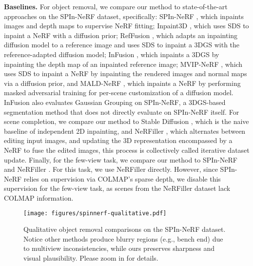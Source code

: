 \noindent\textbf{Baselines.}
For object removal, we compare our method to state-of-the-art approaches on the SPIn-NeRF dataset, specifically:
SPIn-NeRF \cite{spinnerf}, which inpaints images and depth maps to supervise NeRF fitting;
Inpaint3D \cite{prabhu2023inpaint3d}, which uses SDS \cite{poole2022dreamfusion} to inpaint a NeRF with a diffusion prior;
RefFusion \cite{mirzaei2024reffusion}, which adapts an inpainting diffusion model to a reference image and uses SDS to inpaint a 3DGS \cite{kerbl3Dgaussians} with the reference-adapted diffusion model;
InFusion \cite{liu2024infusion}, which inpaints a 3DGS by inpainting the depth map of an inpainted reference image;
MVIP-NeRF \cite{chen2024mvip}, which uses SDS to inpaint a NeRF by inpainting the rendered images and normal maps via a diffusion prior,
and MALD-NeRF \cite{lin2025taming}, which inpaints a NeRF by performing masked adversarial training for per-scene customization of a diffusion model.
InFusion \cite{liu2024infusion} also evaluates Gaussian Grouping \cite{ye2023gaussian} on SPIn-NeRF, a 3DGS-based segmentation method that does not directly evaluate on SPIn-NeRF itself.
For scene completion, we compare our method to 
Stable Diffusion \cite{stable.diffusion}, which is the naive baseline of independent 2D inpainting, and NeRFiller \cite{weber2024nerfiller}, which 
alternates between editing input images, and updating the 3D representation encompassed by a NeRF
to fuse the edited images, this process is collectively called iterative dataset update. 
Finally, for the few-view task, we compare our method to SPIn-NeRF \cite{spinnerf} and NeRFiller \cite{weber2024nerfiller}. For this task, we use NeRFiller directly.
However, since SPIn-NeRF relies on supervision via COLMAP's \cite{schoenberger2016sfm} sparse depth, we disable this supervision for the few-view task, as scenes from the NeRFiller dataset lack COLMAP information.

\begin{figure*}[t]
    \centering
    \texttt{[image: figures/spinnerf-qualitative.pdf]}
    \vspace{-20pt}
    \caption{
    Qualitative object removal comparisons on the SPIn-NeRF dataset. Notice other methods produce blurry regions (e.g., bench end) due to multiview inconsistencies, while ours preserves sharpness and visual plausibility. Please zoom in for details.
    }
    \label{fig:spinnerf-qualitative}
    \vspace{-15pt}
\end{figure*}

